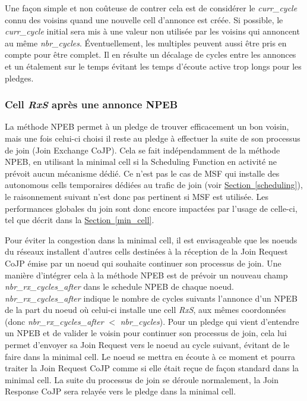 \documentclass[]{report}
\newcommand{\wordlink}[2]{\hyperref[#2]{#1~\ref{#2}}}
\begin{document}
Une façon simple et non coûteuse de contrer cela est de considérer le \textit{curr\_cycle} connu des voisins quand une nouvelle cell d'annonce est créée. Si possible, le \textit{curr\_cycle} initial sera mis à une valeur non utilisée par les voisins qui annoncent au même \textit{nbr\_cycles}. Éventuellement, les multiples peuvent aussi être pris en compte pour être complet. Il en résulte un décalage de cycles entre les annonces et un étalement sur le temps évitant les temps d'écoute active trop longs pour les pledges.
~\\
\subsubsection{Cell \textit{RxS} après une annonce NPEB}

La méthode NPEB permet à un pledge de trouver efficacement un bon voisin, mais une fois celui-ci choisi il reste au pledge à effectuer la suite de son processus de join (Join Exchange CoJP). Cela se fait indépendamment de la méthode NPEB, en utilisant la minimal cell si la Scheduling Function en activité ne prévoit aucun mécanisme dédié. Ce n'est pas le cas de MSF qui installe des autonomous cells temporaires dédiées au trafic de join (voir \wordlink{Section}{scheduling}), le raisonnement suivant n'est donc pas pertinent si MSF est utilisée. Les performances globales du join sont donc encore impactées par l'usage de celle-ci, tel que décrit dans la \wordlink{Section}{min_cell}.\\

\newpage

Pour éviter la congestion dans la minimal cell, il est envisageable que les noeuds du réseaux installent d'autres cells destinées à la réception de la Join Request CoJP émise par un noeud qui souhaite continuer son processus de join. Une manière d'intégrer cela à la méthode NPEB est de prévoir un nouveau champ \textit{nbr\_rx\_cycles\_after} dans le schedule NPEB de chaque noeud. \textit{nbr\_rx\_cycles\_after} indique le nombre de cycles suivants l'annonce d'un NPEB de la part du noeud où celui-ci installe une cell \textit{RxS}, aux mêmes coordonnées (donc \textit{nbr\_rx\_cycles\_after} $<$ \textit{nbr\_cycles}). Pour un pledge qui vient d'entendre un NPEB et de valider le voisin pour continuer son processus de join, cela lui permet d'envoyer sa Join Request vers le noeud au cycle suivant, évitant de le faire dans la minimal cell. Le noeud se mettra en écoute à ce moment et pourra traiter la Join Request CoJP comme si elle était reçue de façon standard dans la minimal cell. La suite du processus de join se déroule normalement, la Join Response CoJP sera relayée vers le pledge dans la minimal cell.\\
\end{document}
